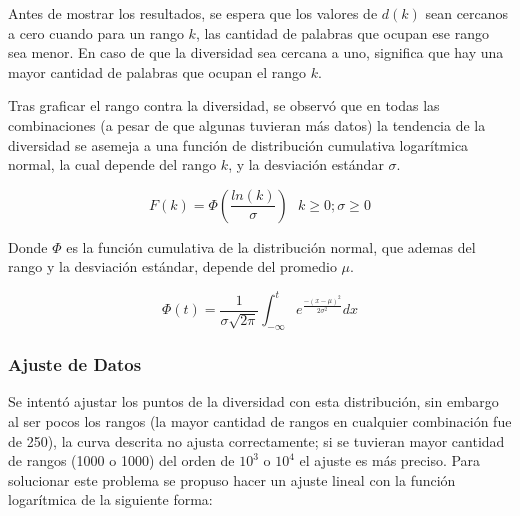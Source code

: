 Antes de mostrar los resultados, se espera  que los valores de $d(k)$ sean cercanos a cero cuando  para un rango $k$, las cantidad de palabras que ocupan ese rango sea menor. En caso de que la diversidad sea cercana a uno,  significa que hay una mayor cantidad de palabras que ocupan el rango $k$. 


Tras graficar el rango contra la diversidad, se observó que en todas las combinaciones (a pesar de que algunas tuvieran más datos)  la tendencia de la diversidad  se asemeja a una función de distribución cumulativa logarítmica  normal, la cual depende del rango $k$, y la desviación estándar $\sigma$.

\begin{equation}
	\label{ec.cumulativa}
	F(k) = \Phi \left ( \frac{ln(k)}{\sigma} \right )\,\,\,\,k\geq 0; \sigma \geq 0
\end{equation}

Donde $\Phi$ es la función cumulativa de la distribución normal, que ademas del rango y la desviación estándar, depende del promedio $\mu$.

\begin{equation}
	\label{ec.distribucionnormal}
	\Phi(t) = \frac{1}{\sigma\sqrt{2\pi}} \int_{-\infty}^{t}  e^{ \frac{ - \left ( x-\mu \right )^{2}}{2\sigma^2}  } dx	
\end{equation}


\newpage
\subsubsection*{Ajuste de Datos }


Se intentó ajustar los puntos de la diversidad con esta distribución, sin embargo al ser pocos los rangos (la mayor cantidad de rangos en cualquier combinación fue de 250),  la curva descrita  no ajusta correctamente;  si se tuvieran mayor cantidad de rangos (1000 o 1000) del orden de $10^{3}$ o $10^{4}$ el ajuste es más preciso.  Para solucionar este problema se propuso hacer un ajuste lineal con la función logarítmica  de la siguiente forma:


